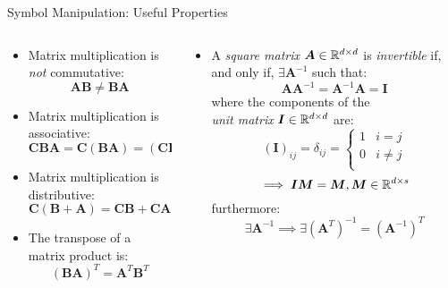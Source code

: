 \documentclass[mathserif, aspectratio=169]{beamer}
\begin{document}
\begin{frame}{Symbol Manipulation: Useful Properties}
	\vspace{-5mm}
	\begin{columns}[t]
		\begin{column}{0.5\textwidth}
			\begin{itemize}
				\item Matrix multiplication is \emph{not} commutative:
					\[ \bm{AB} \ne \bm{BA} \]
				\item Matrix multiplication is associative:
					\[ \bm{CBA} = \bm{C}(\bm{BA}) = (\bm{CB})\bm{A} \]
				\item Matrix multiplication is distributive:
					\[ \bm{C} (\bm{B} + \bm{A}) = \bm{CB} + \bm{CA} \]
				\item The transpose of a matrix product is:
					\[ (\bm{BA})^T = \bm{A}^T\bm{B}^T \]
			\end{itemize}
		\end{column}
		\begin{column}{0.5\textwidth}
			\begin{itemize}
				\item A \emph{square matrix} $\bm{A} \in \mathbb{R}^{d\times d}$ is \emph{invertible} if, 
					and only if, $\exists\bm{A}^{-1}$ such that:
					\[ \bm{A}\bm{A}^{-1} = \bm{A}^{-1}\bm{A} = \bm{I} \]
					where the components of the \\ \emph{unit matrix} $\bm{I} \in \mathbb{R}^{d\times d}$ are:
					\[ (\bm{I})_{ij} = \delta_{ij} = 
						\begin{cases}
							1 & i = j \\
							0 & i \ne j \\
						\end{cases}
					\]
					\[ \implies \bm{I}\bm{M} = \bm{M}, \bm{M} \in \mathbb{R}^{d\times s} \]
					furthermore:
					\[ \exists\bm{A}^{-1}\implies\exists(\bm{A}^T)^{-1} = (\bm{A}^{-1})^T\]
			\end{itemize}
		\end{column}
	\end{columns}
	\vspace{-2mm}
\end{frame}
\end{document}

